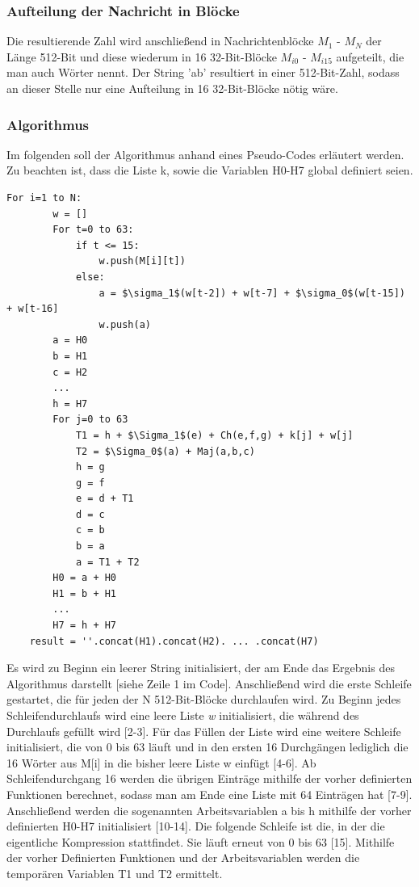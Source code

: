 \subsubsection{Aufteilung der Nachricht in Blöcke}
Die resultierende Zahl wird anschließend in Nachrichtenblöcke $M_1$ - $M_N$ der Länge 512-Bit und diese wiederum in 16 32-Bit-Blöcke $M_{i0}$ - $M_{i15}$ aufgeteilt, die man auch Wörter nennt. Der String 'ab' resultiert in einer 512-Bit-Zahl, sodass an dieser Stelle nur eine Aufteilung in 16 32-Bit-Blöcke nötig wäre.

\subsubsection{Algorithmus}
Im folgenden soll der Algorithmus anhand eines Pseudo-Codes erläutert werden. Zu beachten ist, dass die Liste k, sowie die Variablen H0-H7 global definiert seien.
\begin{lstlisting}[mathescape,caption={Pseudocode zu SHA256},captionpos=b]
	For i=1 to N:
		w = []
		For t=0 to 63:
			if t <= 15:
				w.push(M[i][t])
			else:
				a = $\sigma_1$(w[t-2]) + w[t-7] + $\sigma_0$(w[t-15]) + w[t-16]
				w.push(a)
		a = H0
		b = H1
		c = H2
		...
		h = H7
		For j=0 to 63
			T1 = h + $\Sigma_1$(e) + Ch(e,f,g) + k[j] + w[j]
			T2 = $\Sigma_0$(a) + Maj(a,b,c)
			h = g
			g = f
			e = d + T1
			d = c
			c = b
			b = a
			a = T1 + T2
		H0 = a + H0
		H1 = b + H1
		...
		H7 = h + H7
	result = ''.concat(H1).concat(H2). ... .concat(H7)
\end{lstlisting}
Es wird zu Beginn ein leerer String initialisiert, der am Ende das Ergebnis des Algorithmus darstellt [siehe Zeile 1 im Code].
Anschließend wird die erste Schleife gestartet, die für jeden der N 512-Bit-Blöcke durchlaufen wird. Zu Beginn jedes Schleifendurchlaufs wird eine leere Liste \emph{w} initialisiert, die während des Durchlaufs gefüllt wird [2-3].
Für das Füllen der Liste wird eine weitere Schleife initialisiert, die von 0 bis 63 läuft und in den ersten 16 Durchgängen lediglich die 16 Wörter aus M[i] in die bisher leere Liste w einfügt [4-6].
Ab Schleifendurchgang 16 werden die übrigen Einträge mithilfe der vorher definierten Funktionen berechnet, sodass man am Ende eine Liste mit 64 Einträgen hat [7-9].
Anschließend werden die sogenannten Arbeitsvariablen a bis h mithilfe der vorher definierten H0-H7 initialisiert [10-14].
Die folgende Schleife ist die, in der die eigentliche Kompression stattfindet. Sie läuft erneut von 0 bis 63 [15].
Mithilfe der vorher Definierten Funktionen und der Arbeitsvariablen werden die temporären Variablen T1 und T2 ermittelt. 
